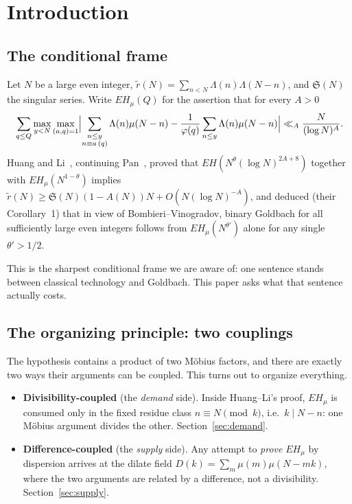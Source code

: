 \documentclass[11pt,a4paper]{article}
\theoremstyle{plain}
\theoremstyle{definition}
\renewcommand{\SS}{\mathfrak{S}}
\begin{document}
\tableofcontents

\section{Introduction}

\subsection{The conditional frame}

Let $N$ be a large even integer,
$\tilde r(N) = \sum_{n<N}\Lambda(n)\Lambda(N-n)$, and $\SS(N)$ the
singular series. Write $EH_\mu(Q)$ for the assertion that for every
$A>0$
\[
  \sum_{q\le Q}\max_{y<N}\max_{(a,q)=1}
  \Bigl|\sum_{\substack{n\le y\\ n\equiv a\,(q)}}\Lambda(n)\mu(N-n)
   -\frac{1}{\varphi(q)}\sum_{n\le y}\Lambda(n)\mu(N-n)\Bigr|
  \ll_A \frac{N}{(\log N)^A}.
\]
Huang and Li~\cite{HL}, continuing Pan~\cite{Pan}, proved that
$EH(N^{\theta}(\log N)^{2A+8})$ together with $EH_\mu(N^{1-\theta})$
implies $\tilde r(N)\ge \SS(N)(1-A(N))N + O(N(\log N)^{-A})$, and
deduced (their Corollary~1) that in view of Bombieri--Vinogradov,
binary Goldbach for all sufficiently large even integers follows from
$EH_\mu(N^{\theta'})$ alone for any single $\theta' > 1/2$.

This is the sharpest conditional frame we are aware of: one sentence
stands between classical technology and Goldbach. This paper asks what
that sentence actually costs.

\subsection{The organizing principle: two couplings}

The hypothesis contains a product of two M\"obius factors, and there
are exactly two ways their arguments can be coupled. This turns out to
organize everything.

\begin{itemize}
\item \textbf{Divisibility-coupled} (the \emph{demand} side). Inside
  Huang--Li's proof, $EH_\mu$ is consumed only in the fixed residue
  class $n \equiv N \pmod k$, i.e.\ $k \mid N-n$: one M\"obius
  argument divides the other. Section~\ref{sec:demand}.
\item \textbf{Difference-coupled} (the \emph{supply} side). Any attempt
  to \emph{prove} $EH_\mu$ by dispersion arrives at the dilate field
  $D(k) = \sum_m \mu(m)\mu(N-mk)$, where the two arguments are related
  by a difference, not a divisibility. Section~\ref{sec:supply}.
\end{itemize}
\end{document}
